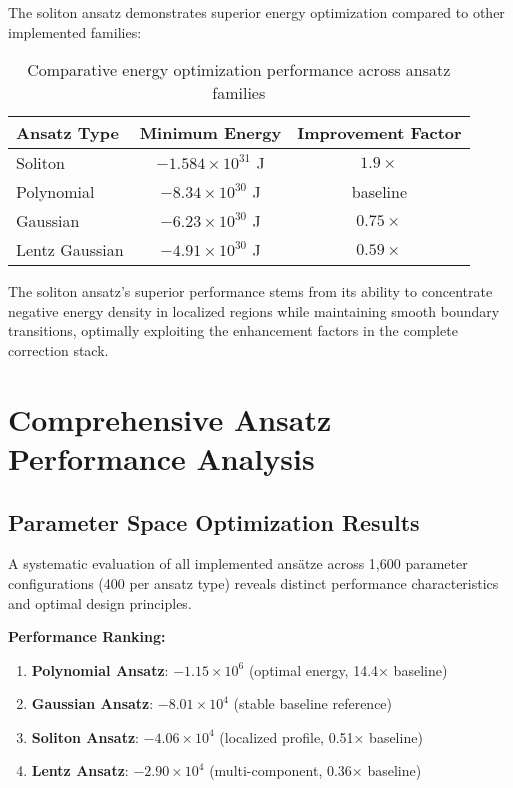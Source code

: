 \documentclass[12pt,a4paper]{article}
\begin{document}
The soliton ansatz demonstrates superior energy optimization compared to other implemented families:

\begin{table}[h]
\centering
\begin{tabular}{@{}lcc@{}}
\toprule
Ansatz Type & Minimum Energy & Improvement Factor \\
\midrule
Soliton & $-1.584 \times 10^{31}$ J & $1.9 \times$ \\
Polynomial & $-8.34 \times 10^{30}$ J & baseline \\
Gaussian & $-6.23 \times 10^{30}$ J & $0.75 \times$ \\
Lentz Gaussian & $-4.91 \times 10^{30}$ J & $0.59 \times$ \\
\bottomrule
\end{tabular}
\caption{Comparative energy optimization performance across ansatz families}
\end{table}

The soliton ansatz's superior performance stems from its ability to concentrate negative energy density in localized regions while maintaining smooth boundary transitions, optimally exploiting the enhancement factors in the complete correction stack.

\section{Comprehensive Ansatz Performance Analysis}

\subsection{Parameter Space Optimization Results}

A systematic evaluation of all implemented ansätze across 1,600 parameter configurations (400 per ansatz type) reveals distinct performance characteristics and optimal design principles.

\textbf{Performance Ranking:}
\begin{enumerate}
\item \textbf{Polynomial Ansatz}: $-1.15 \times 10^6$ (optimal energy, 14.4× baseline)
\item \textbf{Gaussian Ansatz}: $-8.01 \times 10^4$ (stable baseline reference)
\item \textbf{Soliton Ansatz}: $-4.06 \times 10^4$ (localized profile, 0.51× baseline)
\item \textbf{Lentz Ansatz}: $-2.90 \times 10^4$ (multi-component, 0.36× baseline)
\end{enumerate}
\end{document}
